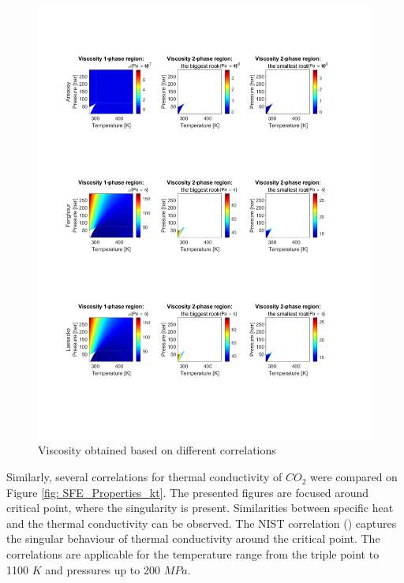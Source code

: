\documentclass[../Article_Model_Parameters.tex]{subfiles}
\begin{document}
\begin{figure}[H]
			\includegraphics[trim = 1.5cm 4.0cm 2.5cm 19.0cm,clip,width=\textwidth]{Figures/MU.pdf}	
			\caption{Viscosity obtained based on different correlations } 
            \label{fig: SFE_Properties_mu}
		\end{figure} 
			
        Similarly, several correlations for thermal conductivity of $CO_2$ were compared on Figure \ref{fig: SFE_Properties_kt}. The presented figures are focused around critical point, where the singularity is present. Similarities between specific heat and the thermal conductivity can be observed. The NIST correlation (\citet{Huber2016}) captures the singular behaviour of thermal conductivity around the critical point. The correlations are applicable for the temperature range from the triple point to 1100 $K$ and pressures up to 200 $MPa$. 
\end{document}
